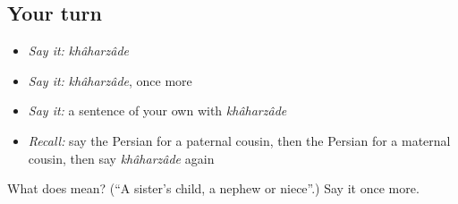 \subsection*{Your turn}
\begin{itemize}
\raggedright
  \item \emph{Say it:} \emph{khâharzâde}
  \item \emph{Say it:} \emph{khâharzâde}, once more
  \item \emph{Say it:} a sentence of your own with \emph{khâharzâde}
  \item \emph{Recall:} say the Persian for a paternal cousin, then the Persian for a maternal cousin, then say \emph{khâharzâde} again
\end{itemize}

\begin{tcolorbox}[breakable,colback=teal!4,colframe=teal!35!black,title={Before you move on}]
What does  mean? (\textquotedblleft{}A sister's child, a nephew or niece\textquotedblright{}.) Say it once more.
\end{tcolorbox}

